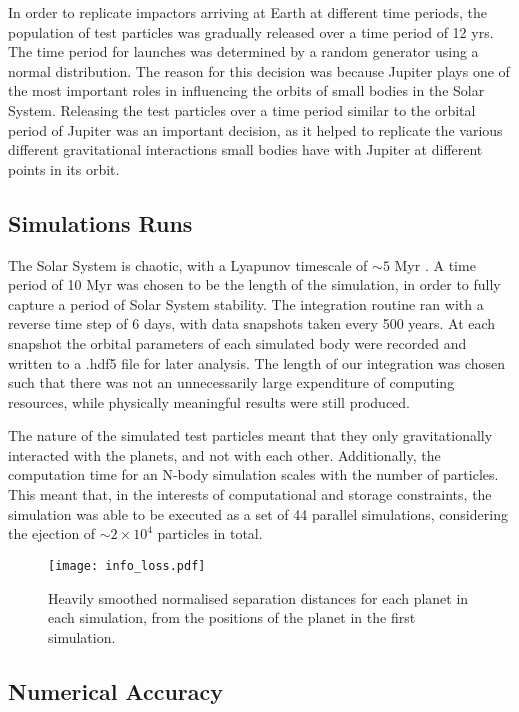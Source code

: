 In order to replicate impactors arriving at Earth at different time periods, the population of test particles was gradually released over a time period of 12 yrs. The time period for launches was determined by a random generator using a normal distribution.  The reason for this decision was because Jupiter plays one of the most important roles in influencing the orbits of small bodies in the Solar System. Releasing the test particles over a time period similar to the orbital period of Jupiter was an important decision, as it helped to replicate the various different gravitational interactions small bodies have with Jupiter at different points in its orbit.

\subsection{Simulations Runs}

The Solar System is chaotic, with a Lyapunov timescale of $\sim 5$ Myr \citep{1996CeMDA..64..115L}. A time period of 10 Myr was chosen to be the length of the simulation, in order to fully capture a period of Solar System stability. The integration routine ran with a reverse time step of 6 days, with data snapshots taken every 500 years. At each snapshot the orbital parameters of each simulated body were recorded and written to a .hdf5 file for later analysis. The length of our integration was chosen such that there was not an unnecessarily large expenditure of computing resources, while physically meaningful results were still produced.

The nature of the simulated test particles meant that they only gravitationally interacted with the planets, and not with each other. Additionally, the computation time for an N-body simulation scales with the number of particles. This meant that, in the interests of computational and storage constraints, the simulation was able to be executed as a set of 44 parallel simulations, considering the ejection of $\sim2\times10^{4}$ particles in total.

\begin{figure}[t!]
    \centering
    \texttt{[image: info\_loss.pdf]}
    \caption[Parallel simulations and their information losses]{Heavily smoothed normalised separation distances for each planet in each simulation, from the positions of the planet in the first simulation.}
    \label{fig:info_loss}
\end{figure}

\clearpage
\subsection{Numerical Accuracy}
\label{sec:accuracy}

